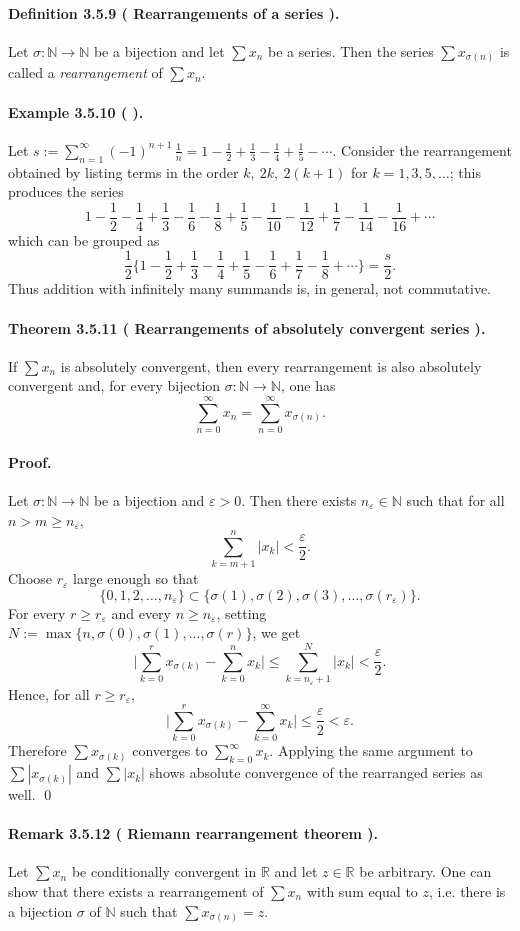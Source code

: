 \documentclass[12pt,a4paper]{article}
\newcommand{\N}{\mathbb{N}}
\newcommand{\R}{\mathbb{R}}
\newcommand{\eps}{\varepsilon}
\newcommand{\NumberedDefinition}[3]{%
\paragraph*{Definition #1 ( #2 ).} #3\par}
\newcommand{\NumberedTheorem}[3]{%
\paragraph*{Theorem #1 ( #2 ).} #3\par}
\newcommand{\NumberedExample}[3]{%
\paragraph*{Example #1 ( #2 ).} #3\par}
\newcommand{\NumberedRemark}[3]{%
\paragraph*{Remark #1 ( #2 ).} #3\par}
\theoremstyle{plain}
\theoremstyle{definition}
\theoremstyle{remark}
\begin{document}
	\NumberedDefinition{3.5.9}{Rearrangements of a series}{Let $\sigma:\N\to\N$ be a bijection and let $\sum x_n$ be a series. Then the series $\sum x_{\sigma(n)}$ is called a \emph{rearrangement} of $\sum x_n$.}

	\NumberedExample{3.5.10}{}{Let $s := \sum_{n=1}^{\infty} (-1)^{n+1}\,\tfrac{1}{n} = 1 - \tfrac12 + \tfrac13 - \tfrac14 + \tfrac15 - \cdots$. Consider the rearrangement obtained by listing terms in the order $k,\ 2k,\ 2(k+1)$ for $k=1,3,5,\dots$; this produces the series
	\[
		1 - \frac12 - \frac14 + \frac13 - \frac16 - \frac18 + \frac15 - \frac1{10} - \frac1{12} + \frac17 - \frac1{14} - \frac1{16} + \cdots
	\]
	which can be grouped as
	\[
		\frac12 \Big\{ 1 - \frac12 + \frac13 - \frac14 + \frac15 - \frac16 + \frac17 - \frac18 + \cdots \Big\} = \frac{s}{2}.
	\]
	Thus addition with infinitely many summands is, in general, not commutative.}

	\NumberedTheorem{3.5.11}{Rearrangements of absolutely convergent series}{If $\sum x_n$ is absolutely convergent, then every rearrangement is also absolutely convergent and, for every bijection $\sigma:\N\to\N$, one has
	\[
		\sum_{n=0}^{\infty} x_n = \sum_{n=0}^{\infty} x_{\sigma(n)}.
	\]}
	\paragraph{Proof.}
	Let $\sigma:\N\to\N$ be a bijection and $\eps>0$. Then there exists $n_\eps\in\N$ such that for all $n>m\ge n_\eps$,
	\[
		\sum_{k=m+1}^{n} |x_k| < \frac{\eps}{2}.
	\]
	Choose $r_\eps$ large enough so that
	\[
		\{0,1,2,\dots,n_\eps\} \subset \{ \sigma(1),\sigma(2),\sigma(3),\dots,\sigma(r_\eps) \}.
	\]
	For every $r\ge r_\eps$ and every $n\ge n_\eps$, setting $N := \max\{n,\sigma(0),\sigma(1),\dots,\sigma(r)\}$, we get
	\[
		\Bigg| \sum_{k=0}^{r} x_{\sigma(k)} - \sum_{k=0}^{n} x_k \Bigg| \le \sum_{k=n_\eps+1}^{N} |x_k| < \frac{\eps}{2}.
	\]
	Hence, for all $r\ge r_\eps$,
	\[
		\Bigg| \sum_{k=0}^{r} x_{\sigma(k)} - \sum_{k=0}^{\infty} x_k \Bigg| \le \frac{\eps}{2} < \eps.
	\]
	Therefore $\sum x_{\sigma(k)}$ converges to $\sum_{k=0}^{\infty} x_k$. Applying the same argument to $\sum |x_{\sigma(k)}|$ and $\sum |x_k|$ shows absolute convergence of the rearranged series as well. \qed

	\NumberedRemark{3.5.12}{Riemann rearrangement theorem}{Let $\sum x_n$ be conditionally convergent in $\R$ and let $z\in\R$ be arbitrary. One can show that there exists a rearrangement of $\sum x_n$ with sum equal to $z$, i.e. there is a bijection $\sigma$ of $\N$ such that $\sum x_{\sigma(n)} = z$.}
\end{document}

